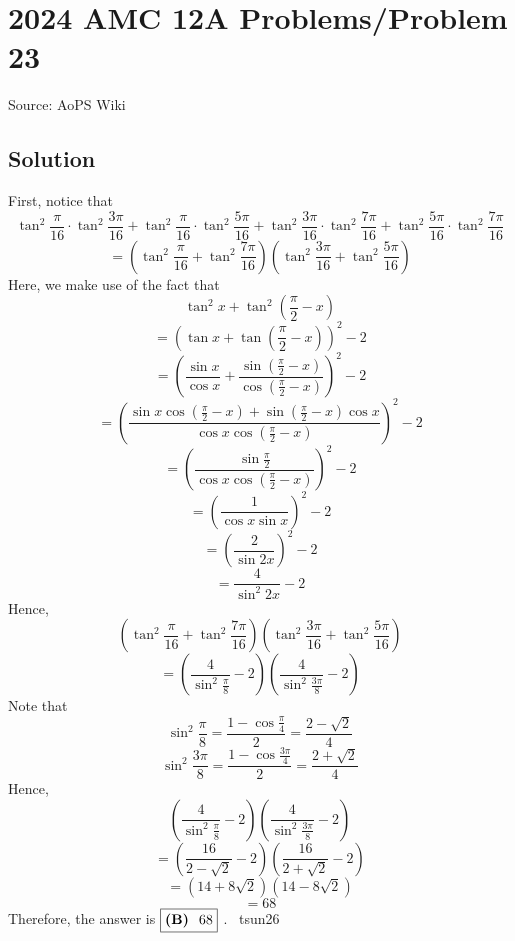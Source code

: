 \documentclass[12pt]{article}
\begin{document}
\section*{{2024 AMC 12A Problems/Problem 23}}
Source: AoPS Wiki

\subsection*{Solution}
First, notice that \[\tan^2 \frac {\pi}{16} \cdot \tan^2 \frac {3\pi}{16} + \tan^2 \frac {\pi}{16} \cdot \tan^2 \frac {5\pi}{16}+\tan^2 \frac {3\pi}{16} \cdot \tan^2 \frac {7\pi}{16}+\tan^2 \frac {5\pi}{16} \cdot \tan^2 \frac {7\pi}{16}\] \[=(\tan^2\frac{\pi}{16}+\tan^2 \frac{7\pi}{16})(\tan^2\frac{3\pi}{16}+\tan^2 \frac{5\pi}{16})\] Here, we make use of the fact that \[\tan^2 x+\tan^2 (\frac{\pi}{2}-x)\] \[=(\tan x+\tan (\frac{\pi}{2}-x))^2-2\] \[=\left(\frac{\sin x}{\cos x}+\frac{\sin (\frac{\pi}{2}-x)}{\cos (\frac{\pi}{2}-x)}\right)^2-2\] \[=\left(\frac{\sin x \cos (\frac{\pi}{2}-x)+\sin (\frac{\pi}{2}-x) \cos x}{\cos x \cos (\frac{\pi}{2}-x)}\right)^2-2\] \[=\left(\frac{\sin \frac{\pi}{2}}{\cos x \cos (\frac{\pi}{2}-x)}\right)^2-2\] \[=\left(\frac{1}{\cos x \sin x}\right)^2-2\] \[=\left(\frac{2}{\sin 2x}\right)^2-2\] \[=\frac{4}{\sin^2 2x}-2\] Hence, \[(\tan^2\frac{\pi}{16}+\tan^2 \frac{7\pi}{16})(\tan^2\frac{3\pi}{16}+\tan^2 \frac{5\pi}{16})\] \[=\left(\frac{4}{\sin^2 \frac{\pi}{8}}-2\right)\left(\frac{4}{\sin^2 \frac{3\pi}{8}}-2\right)\] Note that \[\sin^2 \frac{\pi}{8}=\frac{1-\cos \frac{\pi}{4}}{2}=\frac{2-\sqrt{2}}{4}\] \[\sin^2 \frac{3\pi}{8}=\frac{1-\cos \frac{3\pi}{4}}{2}=\frac{2+\sqrt{2}}{4}\] Hence, \[\left(\frac{4}{\sin^2 \frac{\pi}{8}}-2\right)\left(\frac{4}{\sin^2 \frac{3\pi}{8}}-2\right)\] \[=\left(\frac{16}{2-\sqrt{2}}-2\right)\left(\frac{16}{2+\sqrt{2}}-2\right)\] \[=(14+8\sqrt{2})(14-8\sqrt{2})\] \[=68\] Therefore, the answer is $\fbox{\textbf{(B) } 68}$ . ~tsun26
\end{document}
